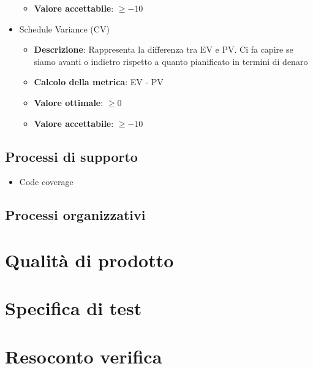 \documentclass[12pt]{article}
\begin{document}
\begin{itemize}
\begin{itemize}
		\item \textbf{Valore accettabile}: $\ge -10$
	\end{itemize}
	\item Schedule Variance (CV)
	\begin{itemize}
		\item \textbf{Descrizione}: Rappresenta la differenza tra EV e PV. Ci fa capire se siamo avanti o indietro rispetto a quanto pianificato in termini di denaro
		\item \textbf{Calcolo della metrica}:  EV - PV
		\item \textbf{Valore ottimale}: $\ge 0$
		\item \textbf{Valore accettabile}: $\ge -10$
	\end{itemize}
\end{itemize}
\subsection{Processi di supporto}
\begin{itemize}
	\item Code coverage
\end{itemize}
\subsection{Processi organizzativi}
\section{Qualità di prodotto}
\section{Specifica di test}
\section {Resoconto verifica}
\end{document}
